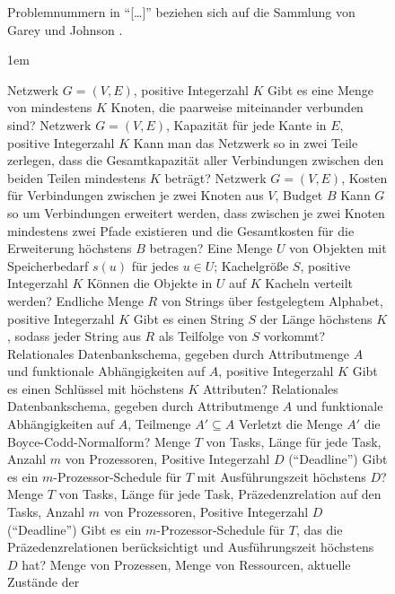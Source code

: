 \begin{figure}
\begin{center}
\footnotesize
Problemnummern in "`[\dots]"' beziehen sich auf die Sammlung von
Garey und Johnson \cite{GaJo79}.

\columnsep1em
\begin{multicols}{2}
{Netzwerk $G=(V,E)$, positive Integerzahl $K$}
{Gibt es eine Menge von mindestens $K$ Knoten, die paarweise miteinander
verbunden sind?}
%
{Netzwerk $G=(V,E)$, Kapazität für jede Kante in $E$, positive
Integerzahl $K$}
{Kann man das Netzwerk so in zwei Teile zerlegen, dass die Gesamtkapazität
aller Verbindungen zwischen den beiden Teilen mindestens $K$ beträgt?}
%
{Netzwerk $G=(V,E)$, Kosten für Verbindungen zwischen je zwei Knoten aus 
$V$, Budget $B$}
{Kann $G$ so um Verbindungen erweitert werden, dass zwischen je zwei Knoten
mindestens zwei Pfade existieren und die Gesamtkosten für die Erweiterung
höchstens $B$ betragen?}
%
{Eine Menge $U$ von Objekten mit Speicherbedarf $s(u)$ für jedes $u \in U$;
Kachelgröße $S$, positive Integerzahl $K$}
{Können die Objekte in $U$ auf $K$ Kacheln verteilt werden?}
%
{Endliche Menge $R$ von Strings über festgelegtem Alphabet, positive
Integerzahl $K$}
{Gibt es einen String $S$ der Länge höchstens $K$, sodass jeder String aus $R$
als Teilfolge von $S$ vorkommt?}
%
{Relationales Datenbankschema, gegeben durch Attributmenge $A$ und
funktionale Abhängigkeiten auf $A$, positive Integerzahl $K$}
{Gibt es einen Schlüssel mit höchstens $K$ Attributen?}
%
\goodbreak
%
{Relationales Datenbankschema, gegeben durch Attributmenge $A$ und
funktionale Abhängigkeiten auf $A$, Teilmenge $A' \subseteq A$}
{Verletzt die Menge $A'$ die Boyce-Codd-Normalform?}
%
{Menge $T$ von Tasks, Länge für jede Task, Anzahl $m$ von Prozessoren, 
Positive Integerzahl $D$ ("`Deadline"')}
{Gibt es ein $m$-Prozessor-Schedule für $T$ mit Ausführungszeit höchstens
$D$?}
%
{Menge $T$ von Tasks, Länge für jede Task, Präzedenzrelation auf den
Tasks, Anzahl $m$ von Prozessoren, Positive Integerzahl $D$
("`Deadline"')}
{Gibt es ein $m$-Prozessor-Schedule für $T$, das die
Präzedenzrelationen berücksichtigt und Ausführungszeit höchstens $D$
hat?}
%
{Menge von Prozessen, Menge von Ressourcen, aktuelle Zustände der 
}
\end{multicols}
\end{center}
\end{figure}
